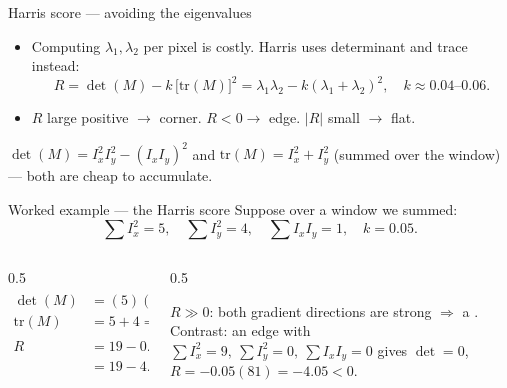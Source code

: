 \documentclass[10pt,aspectratio=169]{beamer}
\begin{document}
\begin{frame}{Harris score — avoiding the eigenvalues}
  \begin{itemize}
    \item Computing $\lambda_1,\lambda_2$ per pixel is costly. Harris uses determinant and trace instead:
    \[ R=\det(M)-k\,\big[\mathrm{tr}(M)\big]^2
        = \lambda_1\lambda_2 - k(\lambda_1+\lambda_2)^2, \quad k\approx0.04\text{--}0.06. \]
    \item $R$ large positive $\rightarrow$ corner. $R<0 \rightarrow$ edge. $|R|$ small $\rightarrow$ flat.
  \end{itemize}
  \begin{mathbox}
    $\det(M)=I_x^2I_y^2-(I_xI_y)^2$ and $\mathrm{tr}(M)=I_x^2+I_y^2$ (summed over the window) — both
    are cheap to accumulate.
  \end{mathbox}
\end{frame}

\begin{frame}{Worked example — the Harris score}
  Suppose over a window we summed:
  \[ \textstyle\sum I_x^2 = 5,\quad \sum I_y^2 = 4,\quad \sum I_xI_y = 1,\quad k=0.05. \]
  \begin{columns}[T]
    \begin{column}{0.5\textwidth}
      \begin{align*}
        \det(M) &= (5)(4)-(1)^2 = 19,\\
        \mathrm{tr}(M) &= 5+4 = 9,\\
        R &= 19 - 0.05\,(9)^2\\
          &= 19 - 4.05 = \mathbf{14.95}.
      \end{align*}
    \end{column}
    \begin{column}{0.5\textwidth}
      \begin{infobox}[Reading it]
        $R \gg 0$: both gradient directions are strong $\Rightarrow$ a . \\[3pt]
        Contrast: an edge with $\sum I_x^2=9,\ \sum I_y^2=0,\ \sum I_xI_y=0$ gives $\det=0$,
        $R=-0.05(81)=-4.05<0$.
      \end{infobox}
    \end{column}
  \end{columns}
\end{frame}
\end{document}
